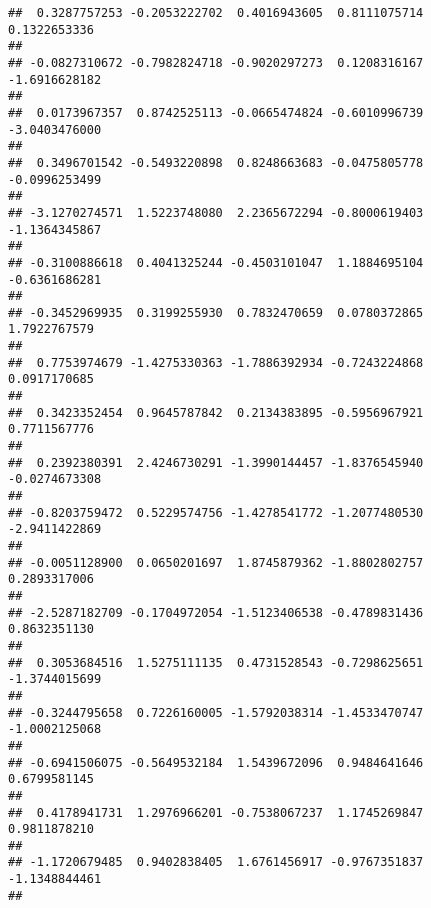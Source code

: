 \documentclass[]{article}
\begin{document}
\begin{verbatim}
##  0.3287757253 -0.2053222702  0.4016943605  0.8111075714  0.1322653336 
##                                                                       
## -0.0827310672 -0.7982824718 -0.9020297273  0.1208316167 -1.6916628182 
##                                                                       
##  0.0173967357  0.8742525113 -0.0665474824 -0.6010996739 -3.0403476000 
##                                                                       
##  0.3496701542 -0.5493220898  0.8248663683 -0.0475805778 -0.0996253499 
##                                                                       
## -3.1270274571  1.5223748080  2.2365672294 -0.8000619403 -1.1364345867 
##                                                                       
## -0.3100886618  0.4041325244 -0.4503101047  1.1884695104 -0.6361686281 
##                                                                       
## -0.3452969935  0.3199255930  0.7832470659  0.0780372865  1.7922767579 
##                                                                       
##  0.7753974679 -1.4275330363 -1.7886392934 -0.7243224868  0.0917170685 
##                                                                       
##  0.3423352454  0.9645787842  0.2134383895 -0.5956967921  0.7711567776 
##                                                                       
##  0.2392380391  2.4246730291 -1.3990144457 -1.8376545940 -0.0274673308 
##                                                                       
## -0.8203759472  0.5229574756 -1.4278541772 -1.2077480530 -2.9411422869 
##                                                                       
## -0.0051128900  0.0650201697  1.8745879362 -1.8802802757  0.2893317006 
##                                                                       
## -2.5287182709 -0.1704972054 -1.5123406538 -0.4789831436  0.8632351130 
##                                                                       
##  0.3053684516  1.5275111135  0.4731528543 -0.7298625651 -1.3744015699 
##                                                                       
## -0.3244795658  0.7226160005 -1.5792038314 -1.4533470747 -1.0002125068 
##                                                                       
## -0.6941506075 -0.5649532184  1.5439672096  0.9484641646  0.6799581145 
##                                                                       
##  0.4178941731  1.2976966201 -0.7538067237  1.1745269847  0.9811878210 
##                                                                       
## -1.1720679485  0.9402838405  1.6761456917 -0.9767351837 -1.1348844461 
##                                                                       

\end{verbatim}
\end{document}
